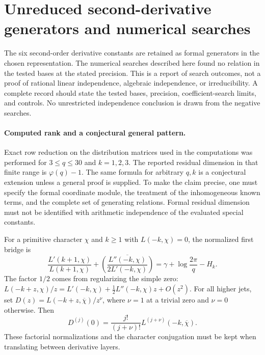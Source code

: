 
\section{Unreduced second-derivative generators and numerical searches}
The six second-order derivative constants are retained as formal generators
in the chosen representation. The numerical searches described here found
no relation in the tested bases at the stated precision. This is a report
of search outcomes, not a proof of rational linear independence, algebraic
independence, or irreducibility. A complete record should state the tested
bases, precision, coefficient-search limits, and controls. No unrestricted
independence conclusion is drawn from the negative searches.

\paragraph{Computed rank and a conjectural general pattern.}
Exact row reduction on the distribution matrices used in the computations
was performed for $3\le q\le30$ and $k=1,2,3$. The reported residual dimension
in that finite range is $\varphi(q)-1$. The same formula for arbitrary $q,k$
is a conjectural extension unless a general proof is supplied. To make the
claim precise, one must specify the formal coordinate module, the treatment
of the inhomogeneous known terms, and the complete set of generating
relations. Formal residual dimension must not be identified with arithmetic
independence of the evaluated special constants.

For a primitive character $\chi$ and $k\ge1$ with $L(-k,\chi)=0$,
the normalized first bridge is
\[
 \frac{L'(k+1,\chi)}{L(k+1,\chi)}
 +\overline{\left(\frac{L''(-k,\chi)}{2L'(-k,\chi)}\right)}
 =\gamma+\log\frac{2\pi}{q}-H_k.
\]
The factor $1/2$ comes from regularizing the simple zero:
$L(-k+z,\chi)/z=L'(-k,\chi)+\tfrac12L''(-k,\chi)z+O(z^2)$.
For all higher jets, set
$D(z)=L(-k+z,\overline\chi)/z^\nu$, where $\nu=1$ at a trivial zero
and $\nu=0$ otherwise. Then
\[
 D^{(j)}(0)=\frac{j!}{(j+\nu)!}L^{(j+\nu)}(-k,\overline\chi).
\]
These factorial normalizations and the character conjugation must be kept
when translating between derivative layers.

